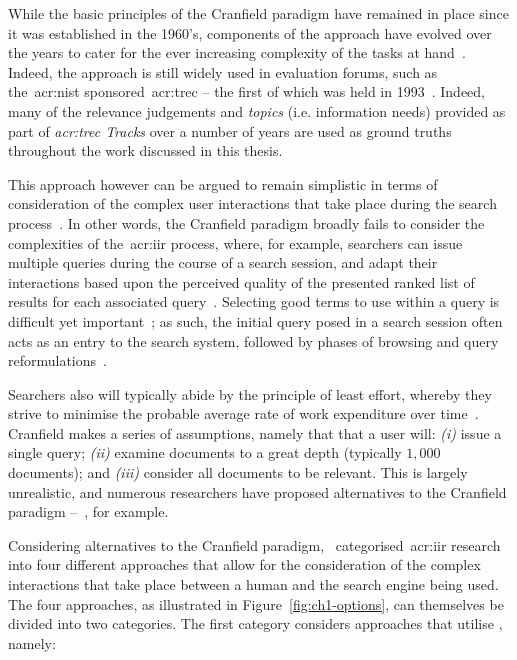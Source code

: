 While the basic principles of the Cranfield paradigm have remained in place since it was established in the 1960's, components of the approach have evolved over the years to cater for the ever increasing complexity of the tasks at hand~\citep{harman2010cranfield}. Indeed, the approach is still widely used in evaluation forums, such as the~\gls{acr:nist} sponsored~\gls{acr:trec} -- the first of which was held in 1993~\citep{harman1993trec1}. Indeed, many of the relevance judgements and \emph{topics} (i.e. information needs) provided as part of \emph{\gls{acr:trec} Tracks} over a number of years are used as ground truths throughout the work discussed in this thesis.

This approach however can be argued to remain simplistic in terms of consideration of the complex user interactions that take place during the search process~\citep{borlund2000evaluation_iir,ingwersen2005theturn}. In other words, the Cranfield paradigm broadly fails to consider the complexities of the~\gls{acr:iir} process, where, for example, searchers can issue multiple queries during the course of a search session, and adapt their interactions based upon the perceived quality of the presented ranked list of results for each associated query~\citep{moffat2013users_versus_models}. Selecting good terms to use within a query is difficult yet important~\citep{efthimiadis2000query_expansion}; as such, the initial query posed in a search session often acts as an entry to the search system, followed by phases of browsing and query reformulations~\citep{marchionini1993information_seeking}.

Searchers also will typically abide by the principle of least effort, whereby they strive to minimise the probable average rate of work expenditure over time~\citep{zipf1949behaviour}. Cranfield makes a series of assumptions, namely that that a user will: \emph{(i)} issue a single query; \emph{(ii)} examine documents to a great depth (typically $1,000$ documents); and \emph{(iii)} consider all documents to be relevant. This is largely unrealistic, and numerous researchers have proposed alternatives to the Cranfield paradigm --~\cite{borlund2003iir_model}, for example.

Considering alternatives to the Cranfield paradigm,~\cite{keskustalo2008user_simulation} categorised~\gls{acr:iir} research into four different approaches that allow for the consideration of the complex interactions that take place between a human and the search engine being used. The four approaches, as illustrated in Figure~\ref{fig:ch1-options}, can themselves be divided into two categories. The first category considers approaches that utilise , namely:

